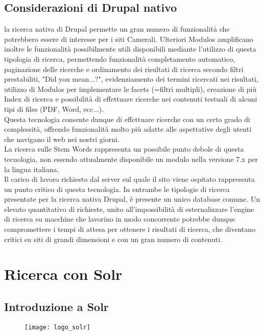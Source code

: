 		\subsection{Considerazioni di Drupal nativo}
		la ricerca nativa di \gls{Drupal} permette un gran numero di funzionalità che potrebbero essere di interesse per i siti Camerali. Ulteriori \glspl{Modulo} amplificano inoltre le funzionalità possibilmente utili disponibili mediante l'utilizzo di questa tipologia di ricerca, permettendo funzionalità completamento automatico, paginazione delle ricerche e ordinamento dei risultati di ricerca secondo filtri prestabiliti, "Did you mean...?", evidenziamento dei termini ricercati nei risultati, utilizzo di \glspl{Modulo} per implementare le facets (=filtri multipli), creazione di più \gls{Index} di ricerca e possibilità di effettuare ricerche nei contenuti testuali di alcuni tipi di files (PDF, Word, ecc...). \\
		Questa tecnologia consente dunque di effettuare ricerche con un certo grado di complessità, offrendo funzionalità molto più adatte alle aspettative degli utenti che navigano il web nei nostri giorni. \\
		La ricerca sulle \gls{Stem Words} rappresenta un possibile punto debole di questa tecnologia, non essendo attualmente disponibile un modulo nella versione 7.x per la lingua italiana.\\
		Il carico di lavoro richiesto dal server sul quale il sito viene ospitato rappresenta un punto critico di questa tecnologia. In entrambe le tipologie di ricerca presentate per la ricerca nativa \gls{Drupal}, è presente un unico database comune. Un elevato quantitativo di richieste, unito all'impossibilità di esternalizzare l'engine di ricerca su macchine che lavorino in modo concorrente potrebbe dunque compromettere i tempi di attesa per ottenere i risultati di ricerca, che diventano critici su siti di grandi dimensioni e con un gran numero di contenuti.

	\section{Ricerca con Solr}

		\subsection{Introduzione a Solr}
		
		\begin{figure}[htbp]
			\begin{center}
				\texttt{[image: logo\_solr]}
			\end{center}
		\end{figure}
		
